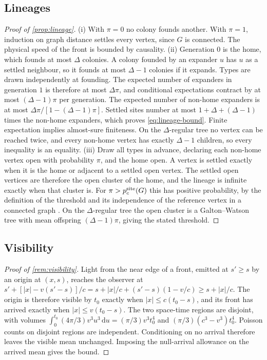 \documentclass[11pt,a4paper]{article}
\theoremstyle{definition}
\newcommand{\dd}{\,\mathrm{d}}
\begin{document}
\subsection{Lineages}
\label{app:lineage-proof}
\begin{proof}[Proof of \cref{prop:lineage}]
(i) With $\pi=0$ no colony founds another. With $\pi=1$, induction on graph
distance settles every vertex, since $G$ is connected. The physical speed of
the front is bounded by causality. (ii) Generation $0$ is the home, which
founds at most $\Delta$ colonies. A colony founded by an expander $u$ has $u$
as a settled neighbour, so it founds at most $\Delta-1$ colonies if it expands.
Types are drawn independently at founding. The expected number of expanders in
generation $1$ is therefore at most $\Delta\pi$, and conditional expectations
contract by at most $(\Delta-1)\pi$ per generation. The expected number of
non-home expanders is at most $\Delta\pi/[1-(\Delta-1)\pi]$. Settled sites
number at most $1+\Delta+(\Delta-1)$ times the non-home expanders, which proves
\cref{eq:lineage-bound}. Finite expectation implies almost-sure finiteness. On
the $\Delta$-regular tree no vertex can be reached twice, and every
non-home vertex has exactly $\Delta-1$ children, so every inequality is an
equality. (iii) Draw all types in advance, declaring each non-home vertex open
with probability $\pi$, and the home open. A vertex is settled exactly when it
is the home or adjacent to a settled open vertex. The settled open vertices are
therefore the open cluster of the home, and the lineage is infinite exactly
when that cluster is. For $\pi>p_c^{\rm site}(G)$ this has positive
probability, by the definition of the threshold and its independence of the
reference vertex in a connected graph \citep{Grimmett1999}. On the
$\Delta$-regular tree the open cluster is a Galton--Watson tree with mean
offspring $(\Delta-1)\pi$, giving the stated threshold.
\end{proof}

\subsection{Visibility}
\label{app:visibility-proof}
\begin{proof}[Proof of \cref{rem:visibility}]
Light from the near edge of a front, emitted at $s'\geq s$ by an origin at
$(x,s)$, reaches the observer at
$s'+[|x|-v(s'-s)]/c=s+|x|/c+(s'-s)(1-v/c)\geq s+|x|/c$. The origin is therefore
visible by $t_0$ exactly when $|x|\leq c(t_0-s)$, and its front has arrived
exactly when $|x|\leq v(t_0-s)$. The two space-time regions are disjoint, with
volumes $\int_0^{t_0}(4\pi/3)v^3u^3\dd u=(\pi/3)v^3t_0^4$ and
$(\pi/3)(c^3-v^3)t_0^4$. Poisson counts on disjoint regions are independent.
Conditioning on no arrival therefore leaves the visible mean unchanged.
Imposing the null-arrival allowance on the arrived mean gives the bound.
\end{proof}
\end{document}
